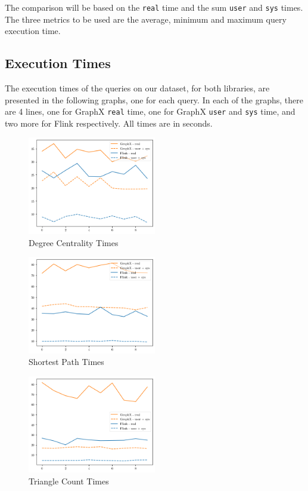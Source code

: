 \documentclass[conference]{IEEEtran}
\begin{document}
The comparison will be based on the \verb|real| time and the sum \verb|user| and \verb|sys| times. The three metrics to be used are the average, minimum and maximum query execution time.

\subsection{Execution Times}

The execution times of the queries on our dataset, for both libraries, are presented in the following graphs, one for each query. In each of the graphs, there are 4 lines, one for GraphX \verb|real| time, one for GraphX \verb|user| and \verb|sys| time, and two more for Flink respectively. All times are in seconds.

\begin{figure}[htbp]
\centerline{\includegraphics[width=0.5\textwidth]{degree-centrality-times.png}}
\caption{Degree Centrality Times}
\label{degreeTimes}
\end{figure}

\begin{figure}[htbp]
\centerline{\includegraphics[width=0.5\textwidth]{shortest-paths-times.png}}
\caption{Shortest Path Times}
\label{shortestTimes}
\end{figure}

\begin{figure}[htbp]
\centerline{\includegraphics[width=0.5\textwidth]{triangle-count-times.png}}
\caption{Triangle Count Times}
\label{triangleTimes}
\end{figure}
\end{document}
